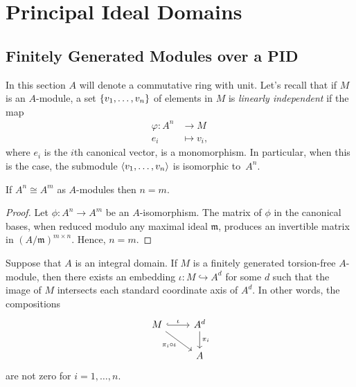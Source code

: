 \chapter{Principal Ideal Domains}

\section{Finitely Generated Modules over a PID}

In this section $A$ will denote a commutative ring with unit. Let's recall that if $M$ is an $A$-module, a set $\{v_1,\dots,v_n\}$ of elements in $M$ is \textsl{linearly independent\/} if the map
\begin{align*}
    \varphi\colon A^n&\to M\\
    e_i&\mapsto v_i,
\end{align*}
where $e_i$ is the $i$th canonical vector, is a monomorphism. In particular, when this is the case, the submodule $\langle v_1,\dots,v_n\rangle$ is isomorphic to~$A^n$.

\begin{lem}
    If $A^n\cong A^m$ as $A$-modules then $n=m$.
\end{lem}

\begin{proof}
    Let $\phi\colon A^n\to A^m$ be an $A$-isomorphism. The matrix of $\phi$ in the canonical bases, when reduced modulo any maximal ideal $\mathfrak m$, produces an invertible matrix in $(A/\mathfrak m)^{m\times n}$. Hence, $n=m$.
\end{proof}

\begin{lem}\label{lem:torsion-free-free-immersion}
    Suppose that\/ $A$ is an integral domain. If\/ $M$ is a finitely generated torsion-free\/ $A$-module, then there exists an embedding\/ $\iota\colon M\hookrightarrow A^d$ for some\/ $d$ such that the image of\/ $M$ intersects each standard coordinate axis of\/ $A^d$. In other words,
    the compositions
    $$
        \begin{tikzcd}
            M
                    \arrow[r,hook,"\iota"]
                    \arrow[rd,"\pi_i\circ\iota"']
                &A^d
                    \arrow[d,"\pi_i"]\\
                &A
        \end{tikzcd}
    $$
    are not zero for\/ $i=1,\dots,n$.
\end{lem}

